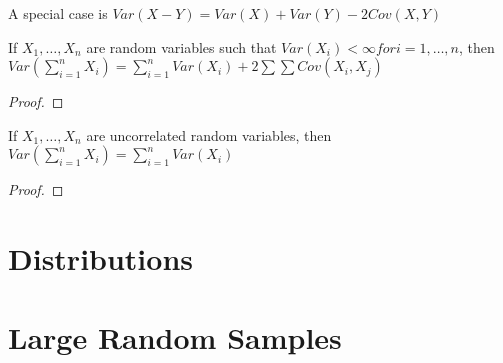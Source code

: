 A special case is $Var\left(X-Y\right)=Var\left(X\right)+Var\left(Y\right)-2Cov\left(X,Y\right)$

\begin{proposition}
If $X_{1},\ldots,X_{n}$ are random variables such that $Var\left(X_{i}\right)<\infty for i=1,\ldots,n$, then $Var\left(\sum_{i=1}^{n}X_{i}\right)=\sum_{i=1}^{n}Var\left(X_{i}\right)+2\sum\sum Cov\left(X_{i},X_{j}\right)$
\end{proposition}
\begin{proof}
\end{proof}

\begin{proposition}
If $X_{1},\ldots,X_{n}$ are uncorrelated random variables, then $Var\left(\sum_{i=1}^{n}X_{i}\right)=\sum_{i=1}^{n}Var\left(X_{i}\right)$
\end{proposition}
\begin{proof}
\end{proof}


%
%

\section{Distributions}
\label{sec:probability_distributions}


%
%

\section{Large Random Samples}
\label{sec:probability_random_samples}

